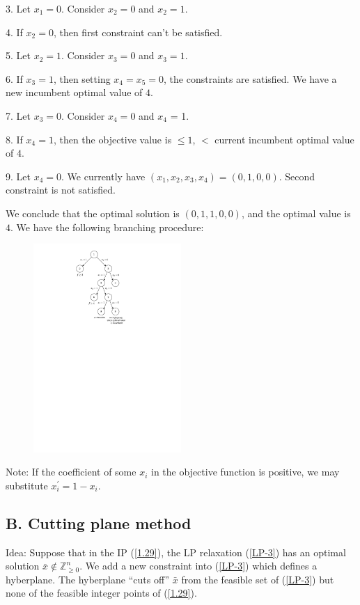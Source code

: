 3. Let $x_1 = 0$. Consider $x_2 = 0$ and $x_2 = 1$.

4. If $x_2 = 0$, then first constraint can't be satisfied.

5. Let $x_2=1$. Consider $x_3=0$ and $x_3=1$.

6. If $x_3=1$, then setting $x_4=x_5=0$, the constraints are satisfied. We have a new incumbent optimal value of $4$.

7. Let $x_3 = 0$. Consider $x_4=0$ and $x_4$ = 1.

8. If $x_4=1$, then the objective value is $\leqslant 1$, $<$ current incumbent optimal value of $4$.

9. Let $x_4=0$. We currently have $(x_1, x_2, x_3, x_4) = (0, 1, 0, 0)$. Second constraint is not satisfied.

We conclude that the optimal solution is $(0, 1, 1, 0, 0)$, and the optimal value is $4$. We have the following branching procedure:
\begin{figure}[H]
    \centering
    \includegraphics[width = 0.5\textwidth, trim = {6cm, 18cm, 6cm, 0cm}, clip]{document/operation_1.pdf}
\end{figure}

Note: If the coefficient of some $x_i$ in the objective function is positive, we may substitute $x^{\prime}_i= 1-x_i$.

\subsection{B. Cutting plane method}

Idea: Suppose that in the IP (\ref{1.29}), the LP relaxation (\ref{LP-3}) has an optimal solution $\bar{x}\notin\mathbb{Z}^n_{\ge 0}$. We add a new constraint into (\ref{LP-3}) which defines a hyberplane. The hyberplane ``cuts off'' $\bar{x}$ from the feasible set of (\ref{LP-3}) but none of the feasible integer points of (\ref{1.29}).

